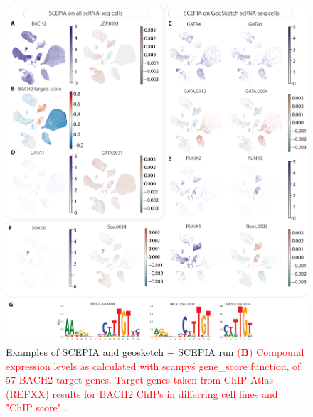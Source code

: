 \begin{figure}
    \centering
    \includegraphics[height=1\linewidth]{ch.scepia/imgs/SCEPIA_SCEPIAGEO_BiologicalExamples_Myriad_v9_SuppFigFeatures1.png}
    \caption{Examples of SCEPIA and geosketch $+$ SCEPIA run \textcolor{red}{(\textbf{B}) Compound expression levels as calculated with scanpy\'s gene_score function, of 57 BACH2 target genes. Target genes taken from ChIP Atlas (REFXX) results for BACH2 ChIPs in differring cell lines and "ChIP score" .}}
    \label{fig:scepia_features1}
\end{figure}

